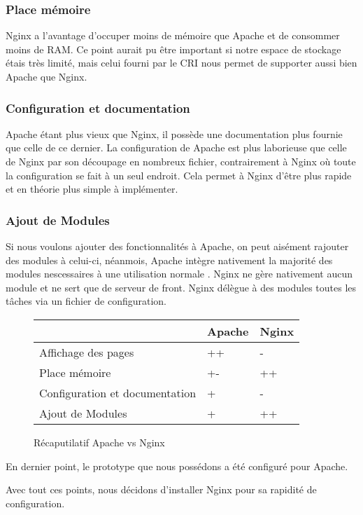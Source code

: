 \subsubsection{Place mémoire}
Nginx a l'avantage d'occuper moins de mémoire que Apache et de consommer moins de RAM.
Ce point aurait pu être important si notre espace de stockage étais très limité, mais celui fourni par le CRI nous permet de supporter aussi bien Apache que Nginx.

\subsubsection{Configuration et documentation}
Apache étant plus vieux que Nginx, il possède une documentation plus fournie que celle de ce dernier.
La configuration de Apache est plus laborieuse que celle de Nginx par son découpage en nombreux fichier, contrairement à Nginx où toute la configuration se fait à un seul endroit.
Cela permet à Nginx d'être plus rapide et en théorie plus simple à implémenter.

\subsubsection{Ajout de Modules}
Si nous voulons ajouter des fonctionnalités à Apache, on peut aisément rajouter des modules à celui-ci, néanmois, Apache intègre nativement la majorité des modules nescessaires à une utilisation \og normale \fg. Nginx ne gère nativement aucun module et ne sert que de serveur de front. Nginx délègue à des modules toutes les tâches via un fichier de configuration.

\begin{figure}[H]
\begin{center}
\begin{tabular}{|m{175pt}|m{50pt}|m{50pt}|}
	\hline
	\null & \textbf{Apache} & \textbf{Nginx} \\
	\hline
	Affichage des pages & ++ & -\\
	\hline
	Place mémoire & +- & ++\\
	\hline
	Configuration et documentation & + & - \\
	\hline
	Ajout de Modules & + & ++ \\
	\hline
\end{tabular} \vspace*{5mm}
\caption{Récaputilatif Apache vs Nginx}
\end{center}
\end{figure}

En dernier point, le prototype que nous possédons a été configuré pour Apache.

Avec tout ces points, nous décidons d'installer Nginx pour sa rapidité de configuration.

